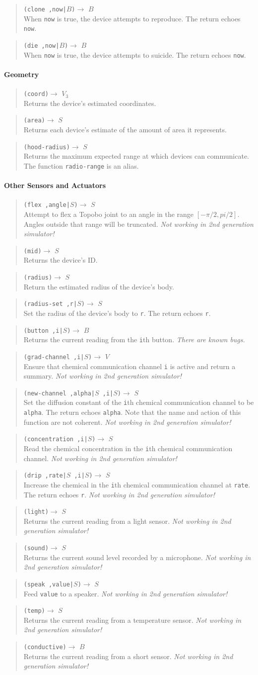 \documentclass{article}
\newcommand\nosecgen{{\em Not working in 2nd generation simulator!}}
\newcommand\bugs{{\em There are known bugs.}}
\newcommand\function[3]
{\begin{quote}{\tt #1}$\rightarrow$ \type{#2} \\ #3 \end{quote}}
\newcommand\type[1]{$#1$}
\newcommand\var[1]{{\tt #1}}
\begin{document}
\function{(clone ,now|\type{B})}{B}{When \var{now} is true, the device
  attempts to reproduce.  The return echoes \var{now}.}

\function{(die ,now|\type{B})}{B}{When \var{now} is true, the device
  attempts to suicide.  The return echoes \var{now}.}

\paragraph{Geometry}

\function{(coord)}{V_3}{Returns the device's estimated coordinates.}
\function{(area)}{S}{Returns each device's estimate of the amount of
  area it represents.}
\function{(hood-radius)}{S}{Returns the maximum expected range at which
  devices can communicate.  The function \var{radio-range} is an alias.}

\paragraph{Other Sensors and Actuators}

\function{(flex ,angle|\type{S})}{S}{Attempt to flex a Topobo
  joint to an angle in the range $[-\pi/2, pi/2]$.  Angles outside
  that range will be truncated.  \nosecgen{}}

\function{(mid)}{S}{Returns the device's ID.}
\function{(radius)}{S}{Return the estimated radius of the device's body.}
\function{(radius-set ,r|\type{S})}{S}{Set the radius of the device's
  body to \var{r}.  The return echoes \var{r}.}

\function{(button ,i|\type{S})}{B}{Returns the current reading from 
  the \var{i}th button.  \bugs{}}

\function{(grad-channel ,i|\type{S})}{V}{Ensure that chemical
  communication channel \var{i} is active and return a summary.
  \nosecgen{}}
\function{(new-channel ,alpha|\type{S} ,i|\type{S})}{S}{Set the
  diffusion constant of the \var{i}th chemical communication channel
  to be \var{alpha}.  The return echoes \var{alpha}.  Note that the
  name and action of this function are not coherent.  \nosecgen{}}
\function{(concentration  ,i|\type{S})}{S}{Read the chemical 
  concentration in the \var{i}th chemical communication channel.
  \nosecgen{}}
\function{(drip ,rate|\type{S} ,i|\type{S})}{S}{Increase the chemical
  in the \var{i}th chemical communication channel at \var{rate}.  The
  return echoes \var{r}.  \nosecgen{}}

\function{(light)}{S}{Returns the current reading from a light sensor.
  \nosecgen{}}
\function{(sound)}{S}{Returns the current sound level recorded by a
  microphone. \nosecgen{}}
\function{(speak ,value|\type{S})}{S}{Feed \var{value} to a speaker.
  \nosecgen{}}
\function{(temp)}{S}{Returns the current reading from a temperature
  sensor.  \nosecgen{}}
\function{(conductive)}{B}{Returns the current reading from a short
  sensor.  \nosecgen{}}
\end{document}
